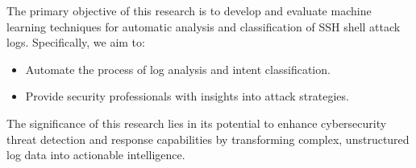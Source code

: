         The primary objective of this research is to develop and evaluate machine learning techniques for automatic analysis and classification of SSH shell attack logs. Specifically, we aim to:
        
        \begin{itemize}
            \item Automate the process of log analysis and intent classification.
            \item Provide security professionals with insights into attack strategies.
        \end{itemize}
        
        The significance of this research lies in its potential to enhance cybersecurity threat detection and response capabilities by transforming complex, unstructured log data into actionable intelligence.
